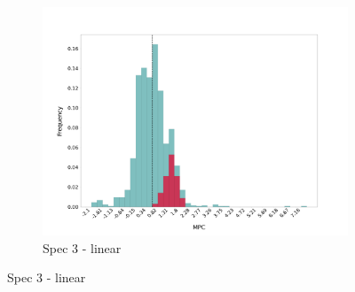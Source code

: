 \begin{figure}[t]
\begin{subfigure}{0.33\linewidth}
    \end{subfigure}\hfill
    \begin{subfigure}{0.33\linewidth}
        \includegraphics[width=\linewidth]{figures/distributions/spec3_lin_chTOTexp.png}
        \caption{Spec 3 - linear}
    \end{subfigure}\hfill


\end{figure}

